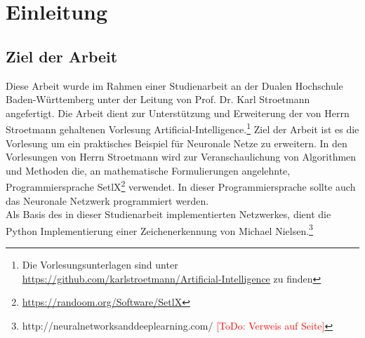 \chapter{Einleitung}

\section{Ziel der Arbeit}
Diese Arbeit wurde im Rahmen einer Studienarbeit an der Dualen Hochschule Baden-Württemberg unter der Leitung von Prof. Dr. Karl Stroetmann angefertigt. Die Arbeit dient zur Unterstützung und Erweiterung der von Herrn Stroetmann gehaltenen Vorlesung \glqq Artificial-Intelligence\grqq .\footnote{Die Vorlesungsunterlagen sind unter \href{https://github.com/karlstroetmann/Artificial-Intelligence}{https://github.com/karlstroetmann/Artificial-Intelligence} zu finden} Ziel der Arbeit ist es die Vorlesung um ein praktisches Beispiel für Neuronale Netze zu erweitern. In den Vorlesungen von Herrn Stroetmann wird zur Veranschaulichung von Algorithmen und Methoden die, an mathematische Formulierungen angelehnte, Programmiersprache SetlX\footnote{\href{https://randoom.org/Software/SetlX}{https://randoom.org/Software/SetlX}} verwendet. In dieser Programmiersprache sollte auch das Neuronale Netzwerk programmiert werden. \\
Als Basis des in dieser Studienarbeit implementierten Netzwerkes, dient die Python Implementierung einer Zeichenerkennung von Michael Nielsen.\footnote{http://neuralnetworksanddeeplearning.com/ \textcolor{red}{[ToDo: Verweis auf Seite]}}

